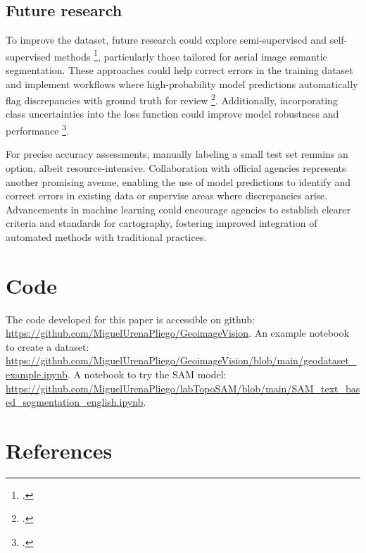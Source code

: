 \begin{refsection}
\subsection{Future research}

To improve the dataset, future research could explore semi-supervised and self-supervised methods \footcite{pelaez-vegas_survey_2023}, particularly those tailored for aerial image semantic segmentation. These approaches could help correct errors in the training dataset and implement workflows where high-probability model predictions automatically flag discrepancies with ground truth for review \footcite{tang_semantic_2023}. Additionally, incorporating class uncertainties into the loss function could improve model robustness and performance \footcite{bressan_semantic_2022}.

For precise accuracy assessments, manually labeling a small test set remains an option, albeit resource-intensive. Collaboration with official agencies represents another promising avenue, enabling the use of model predictions to identify and correct errors in existing data or supervise areas where discrepancies arise. Advancements in machine learning could encourage agencies to establish clearer criteria and standards for cartography, fostering improved integration of automated methods with traditional practices.

\section*{Code}

The code developed for this paper is accessible on github: \url{https://github.com/MiguelUrenaPliego/GeoimageVision}.
An example notebook to create a dataset: \url{https://github.com/MiguelUrenaPliego/GeoimageVision/blob/main/geodataset_example.ipynb}.
A notebook to try the SAM model: \url{https://github.com/MiguelUrenaPliego/labTopoSAM/blob/main/SAM_text_based_segmentation_english.ipynb}.





\newpage

\renewcommand{\sectionnametext}{References}
\renewcommand{\headingtextR}{\thesection. \sectionnametext}
\section{\sectionnametext}

\printbibliography[heading=none]


\end{refsection}

\endinput
